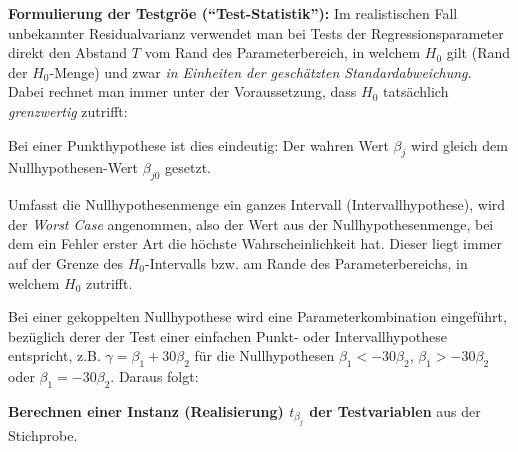 \item \textbf{Formulierung der Testgr\"o\3e (``Test-Statistik''):}
Im realistischen Fall unbekannter Residualvarianz verwendet man bei
Tests der Regressionsparameter direkt
den Abstand $T$ vom Rand des Parameterbereich, in welchem $H_0$ gilt
(Rand der $H_0$-Menge) und zwar
\emph{in Einheiten der gesch\"atzten 
Standardabweichung.}  Dabei rechnet man immer unter der Voraussetzung,
dass $H_0$ tats\"achlich \emph{grenzwertig} zutrifft:
\bi
\item 
Bei einer Punkthypothese ist dies eindeutig: Der wahren Wert $\beta_j$
wird gleich dem 
Nullhypothesen-Wert $\beta_{j0}$ gesetzt.
\item Umfasst die
Nullhypothesenmenge ein ganzes Intervall (Intervallhypothese), wird der 
\emph{Worst Case} angenommen, also der Wert aus der
Nullhypothesenmenge, bei dem
ein Fehler erster Art die h\"ochste Wahrscheinlichkeit hat. Dieser
liegt immer auf der Grenze des $H_0$-Intervalls bzw. am Rande des
Parameterbereichs, in welchem $H_0$ zutrifft.
\item Bei einer gekoppelten Nullhypothese wird eine
  Parameterkombination ein\-ge\-f\"uhrt, bez\"uglich derer der Test einer
  einfachen Punkt- oder Intervallhypothese ent\-spricht,
  z.B. $\gamma=\beta_1+30\beta_2$ f\"ur die Nullhypothesen
  $\beta_1<-30\beta_2$, $\beta_1>-30\beta_2$ oder $\beta_1=-30\beta_2$.
\ei
Daraus folgt: 


\item \textbf{Berechnen einer Instanz (Realisierung) $t_{\beta_j}$ der
Testvariablen} aus der Stichprobe.


